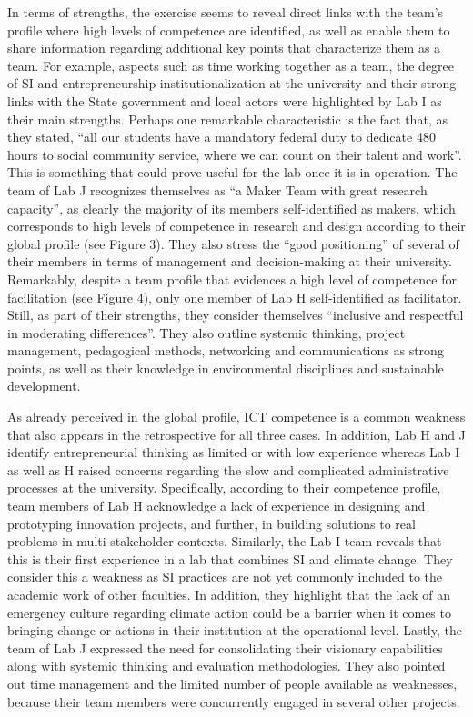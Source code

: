\documentclass[AMA,STIX1COL,APA,STIX2COL]{WileyNJD-v2}
\begin{document}
In terms of strengths, the exercise seems to reveal direct links with
the team's profile where high levels of competence are identified, as
well as enable them to share information regarding additional key points
that characterize them as a team. For example, aspects such as time
working together as a team, the degree of SI and entrepreneurship
institutionalization at the university and their strong links with the
State government and local actors were highlighted by Lab I as their
main strengths. Perhaps one remarkable characteristic is the fact that,
as they stated, ``all our students have a mandatory federal duty to
dedicate 480 hours to social community service, where we can count on
their talent and work''. This is something that could prove useful for
the lab once it is in operation. The team of Lab J recognizes themselves
as ``a Maker Team with great research capacity'', as clearly the
majority of its members self-identified as makers, which corresponds to
high levels of competence in research and design according to their
global profile (see Figure 3). They also stress the ``good positioning''
of several of their members in terms of management and decision-making
at their university. Remarkably, despite a team profile that evidences a
high level of competence for facilitation (see Figure 4), only one
member of Lab H self-identified as facilitator. Still, as part of their
strengths, they consider themselves ``inclusive and respectful in
moderating differences''. They also outline systemic thinking, project
management, pedagogical methods, networking and communications as strong
points, as well as their knowledge in environmental disciplines and
sustainable development.

As already perceived in the global profile, ICT competence is a common
weakness that also appears in the retrospective for all three cases. In
addition, Lab H and J identify entrepreneurial thinking as limited or
with low experience whereas Lab I as well as H raised concerns regarding
the slow and complicated administrative processes at the university.
Specifically, according to their competence profile, team members of Lab
H acknowledge a lack of experience in designing and prototyping
innovation projects, and further, in building solutions to real problems
in multi-stakeholder contexts. Similarly, the Lab I team reveals that
this is their first experience in a lab that combines SI and climate
change. They consider this a weakness as SI practices are not yet
commonly included to the academic work of other faculties. In addition,
they highlight that the lack of an emergency culture regarding climate
action could be a barrier when it comes to bringing change or actions in
their institution at the operational level. Lastly, the team of Lab J
expressed the need for consolidating their visionary capabilities along
with systemic thinking and evaluation methodologies. They also pointed
out time management and the limited number of people available as
weaknesses, because their team members were concurrently engaged in
several other projects.
\end{document}
